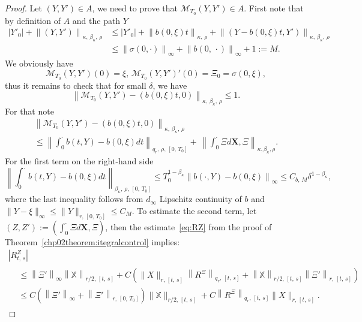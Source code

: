 \documentclass[AHL,Unicode,longabstracts,published]{cedram}
\newcommand{\bbX}{\mathbb{X}}
\newcommand{\calM}{\mathcal{M}}
\begin{document}
\begin{proof}
Let $(Y,Y')\in A$, we need to prove that $\calM_{T_0}(Y,Y')\in A.$ First note that by definition of $A$ and the path $Y$
\begin{equation}
\begin{split}
\left|Y'_0\right|+\left\|\left(Y,Y'\right)\right\|_{\kappa,\,\beta_{\kappa},\,\rho}&\leq \left|Y'_0\right|+\left\|b\left(0, \xi\right) t\right\|_{\kappa,\,\rho}+\left\|\left(Y-b(0,\xi) t,Y'\right)\right\|_{\kappa,\,\beta_{\kappa},\,\rho}\\
&\leq \left\|\sigma(0,\cdot)\right\|_{\infty}+\left\|b(0,\,\cdot)\right\|_{\infty}+1:=M.
\end{split}
\end{equation}
We obviously have
\[
\calM_{T_0}\left(Y,Y'\right)(0)=\xi,\, \calM_{T_0}\left(Y,Y'\right)'(0)=\Xi_0=\sigma\left(0, \xi\right),
\]
thus it remains to check that for small $\delta$, we have
\[
\left\|\calM_{T_0}\left(Y,Y'\right)-(b(0, \xi)t, 0)\right\|_{\kappa,\,\beta_{\kappa},\,\rho}\leq 1.
\]
For that note
\begin{multline}
\left\|\calM_{T_0}(Y,Y')-(b(0, \xi)t, 0)\right\|_{\kappa,\,\beta_{\kappa},\,\rho}\\
\leq \left\|\int_0^{\cdot}b(t, Y)-b(0, \xi) dt\right\|_{q_{r},\,\rho,\,[0,\,T_0]}+\,\left\|\int_0^{\cdot}\Xi d\bm{X}, \Xi\right\|_{\kappa,\beta_{\kappa},\rho}.
\end{multline} 
For the first term on the right-hand side
\[
\left\|\int_0^{\cdot}b(t, Y)-b(0, \xi) dt\right\|_{\beta_{\kappa},\,\rho,\,\left[0,\,T_0\right]}\leq T_0^{1-\beta_{\kappa}}\left\|b(\cdot, Y)-b(0, \xi)\right\|_{\infty}\leq C_{b,\,M}\delta^{1-\beta_{\kappa}},
\]
where the last inequality follows from $d_{\infty}$ Lipschitz continuity of $b$ and $\|Y-\xi\|_\infty\leq \|Y\|_{r,\,[0,\,T_0]}\leq C_{M}$. To estimate the second term, let $(Z, Z'):=\left(\int_0^{\cdot}\Xi d\bm{X}, \Xi\right)$, then the estimate~\eqref{eq:RZ} from the proof of Theorem~\ref{chp02theorem:itegralcontrol} implies:
\begin{multline}\label{eq:RZ0}
\left|R^Z_{t,\,s}\right|\\
\begin{aligned}
&\leq \left\|\Xi'\right\|_{\infty}\left\|\bbX\right\|_{r/2,\,[t,\,s]}+ C\left(\|X\|_{r,\,[t,\,s]}\left\|R^{\Xi}\right\|_{q_{r},\,[t,\,s]}+\left\|\bbX\right\|_{r/2,\,[t,\,s]}\left\|\Xi'\right\|_{r,\,[t,\,s]}\right)\\
&\leq C\left(\left\|\Xi'\right\|_{\infty}+\left\|\Xi'\right\|_{r,\,[0,\,T_0]}\right)\|\bbX\|_{r/2,\,[t,\,s]}+C\left\|R^{\Xi}\right\|_{q_{r},\,[t,\,s]}\|X\|_{r,\,[t,\,s]}.
\end{aligned}
\end{multline}


\end{proof}
\end{document}
